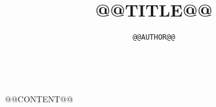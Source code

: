\documentclass[11pt, pdftex]{article}
\title{@@TITLE@@}
\author{\tt @@AUTHOR@@}
\begin{document}
\maketitle

\tt
\noindent

@@CONTENT@@
\end{document}

